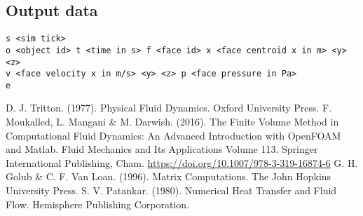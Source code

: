 \documentclass[12pt]{article}
\begin{document}
\subsection{Output data}

\begin{verbatim}
s <sim tick>
o <object id> t <time in s> f <face id> x <face centroid x in m> <y> <z> 
v <face velocity x in m/s> <y> <z> p <face pressure in Pa>
e
\end{verbatim}

\begin{thebibliography}{9}
 D. J. Tritton. (1977). Physical Fluid Dynamics. Oxford University Press.  
 F. Moukalled, L. Mangani \& M. Darwish. (2016). The Finite Volume Method in Computational Fluid Dynamics: An Advanced Introduction with OpenFOAM and Matlab. Fluid Mechanics and Its Applications Volume 113. Springer International Publishing, Cham. \url{https://doi.org/10.1007/978-3-319-16874-6}
 G. H. Golub \& C. F. Van Loan. (1996). Matrix Computations. The John Hopkins University Press.
 S. V. Patankar. (1980). Numerical Heat Transfer and Fluid Flow. Hemisphere Publishing Corporation.
\end{thebibliography}

\end{document}
